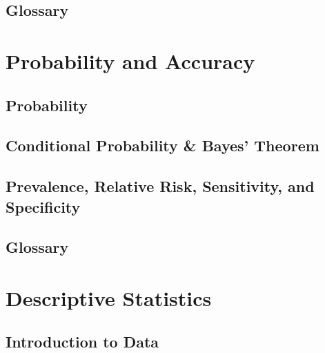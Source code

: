 







\pagestyle{plain}

\maketitle %
% 






\section*{Glossary}


\chapter{Probability and Accuracy } 
\section{Probability}
\section{Conditional Probability \& Bayes’ Theorem}
\section{Prevalence, Relative Risk, Sensitivity, and Specificity}
\section*{Glossary}

\chapter{Descriptive Statistics } 
\section{Introduction to Data}
